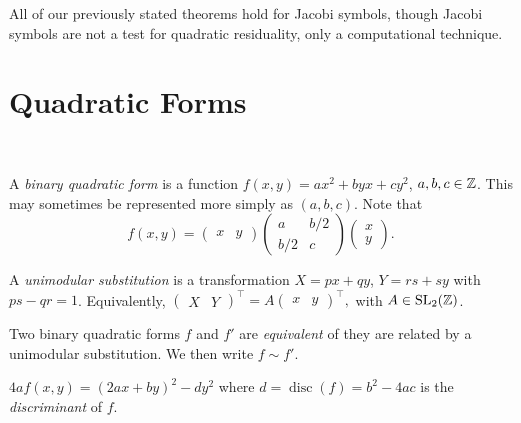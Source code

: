 \documentclass[a4paper, 10pt, twocolumn]{amsart}
\begin{document}
\begin{remark}
    All of our previously stated theorems hold for Jacobi symbols, though Jacobi symbols are not a test for quadratic residuality, only a computational technique. 
\end{remark}

\section{Quadratic Forms}
\ 

\begin{definition}
    A \emph{binary quadratic form} is a function $f(x, y) = ax^2 + byx + cy^2$, $a, b, c \in \mathbb{Z}$. This may sometimes be represented more simply as $(a, b, c)$. Note that
    $$
    f(x, y) = 
    \begin{pmatrix}
        x & y
    \end{pmatrix}
    \begin{pmatrix}
        a & b/2 \\ b/2 & c
    \end{pmatrix} 
    \begin{pmatrix}
        x \\ y
    \end{pmatrix}.
    $$
\end{definition}

\begin{definition}
    A \emph{unimodular substitution} is a transformation $X = px + qy$, $Y = rs + sy$ with $ps - qr = 1$. Equivalently, $\begin{pmatrix}
        X & Y
    \end{pmatrix}^\intercal = A \begin{pmatrix}
        x & y
    \end{pmatrix}^\intercal,$ with $A \in \operatorname{SL}_2(\mathbb{Z})$.
\end{definition}

\begin{definition}
    Two binary quadratic forms $f$ and $f'$ are \emph{equivalent} of they are related by a unimodular substitution. We then write $f \sim f'$.
\end{definition}

\begin{definition}
    $4a f(x, y) = (2ax + by)^2 - dy^2$ where $d = \operatorname{disc}(f) = b^2 - 4ac$ is the \emph{discriminant} of $f$.
\end{definition}
\end{document}
